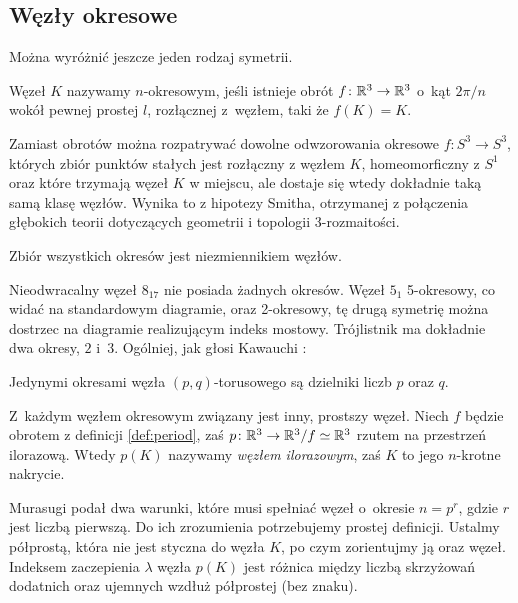 \subsection{Węzły okresowe}
%
Można wyróżnić jeszcze jeden rodzaj symetrii.

\begin{definition}
\label{def:period}%
    Węzeł $K$ nazywamy $n$-okresowym, jeśli istnieje obrót $f \colon \mathbb R^3 \to \mathbb R^3$ o~kąt $2\pi/n$ wokół pewnej prostej $l$, rozłącznej z~węzłem, taki że $f(K) = K$.
\end{definition}

Zamiast obrotów można rozpatrywać dowolne odwzorowania okresowe $f \colon S^3 \to S^3$, których zbiór punktów stałych jest rozłączny z węzłem $K$, homeomorficzny z $S^1$ oraz które trzymają węzeł $K$ w miejscu, ale dostaje się wtedy dokładnie taką samą klasę węzłów.
Wynika to z hipotezy Smitha, otrzymanej z połączenia głębokich teorii dotyczących geometrii i topologii 3-rozmaitości.

\begin{proposition}
    Zbiór wszystkich okresów jest niezmiennikiem węzłów.
\end{proposition}

Nieodwracalny węzeł $8_{17}$ nie posiada żadnych okresów.
Węzeł $5_1$ 5-okresowy, co widać na standardowym diagramie, oraz 2-okresowy, tę drugą symetrię można dostrzec na diagramie realizującym indeks mostowy.
Trójlistnik ma dokładnie dwa okresy, $2$ i~$3$.
Ogólniej, jak głosi Kawauchi \cite[ćwiczenie 10.1.9]{kawauchi96}:

\begin{proposition}
    Jedynymi okresami węzła $(p, q)$-torusowego są dzielniki liczb $p$ oraz $q$.
\end{proposition}

Z~każdym węzłem okresowym związany jest inny, prostszy węzeł.
Niech $f$ będzie obrotem z definicji \ref{def:period}, zaś $p \colon \mathbb R^3 \to \mathbb R^3/f \simeq \mathbb R^3$ rzutem na przestrzeń ilorazową.
%
Wtedy $p(K)$ nazywamy \emph{węzłem ilorazowym}, zaś $K$ to jego $n$-krotne nakrycie.

Murasugi podał dwa warunki, które musi spełniać węzeł o~okresie $n = p^r$, gdzie $r$ jest liczbą pierwszą.
Do ich zrozumienia potrzebujemy prostej definicji.
Ustalmy półprostą, która nie jest styczna do węzła $K$, po czym zorientujmy ją oraz węzeł.
Indeksem zaczepienia $\lambda$ węzła $p(K)$ jest różnica między liczbą skrzyżowań dodatnich oraz ujemnych wzdłuż półprostej (bez znaku).


